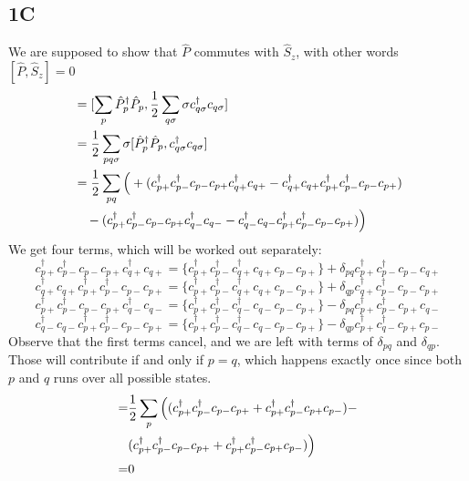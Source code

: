 \documentclass[norsk,a4paper,12pt]{article}
\begin{document}
\subsection*{1C}
We are supposed to show that $\hat{P}$ commutes with $\hat{S}_z$, with other words $[\hat{P},\hat{S}_z]=0$
\begin{align}
[\hat{P},\hat{S}_z]&=[\sum_p\hat{P}_p^{\dagger}\hat{P}_p,\frac{1}{2}\sum_{q\sigma}\sigma c_{q\sigma}^{\dagger}c_{q\sigma}]\notag\\
&=\frac{1}{2}\sum_{pq\sigma}\sigma[\hat{P}_p^{\dagger}\hat{P}_p,c_{q\sigma}^{\dagger}c_{q\sigma}]\notag\\
&=\frac{1}{2}\sum_{pq}\Big(+(c_{p+}^{\dagger}c_{p-}^{\dagger}c_{p-}c_{p+}c_{q+}^{\dagger}c_{q+}-c_{q+}^{\dagger}c_{q+}c_{p+}^{\dagger}c_{p-}^{\dagger}c_{p-}c_{p+})\notag\\
&\quad-(c_{p+}^{\dagger}c_{p-}^{\dagger}c_{p-}c_{p+}c_{q-}^{\dagger}c_{q-}-c_{q-}^{\dagger}c_{q-}c_{p+}^{\dagger}c_{p-}^{\dagger}c_{p-}c_{p+})\Big)
\end{align}
We get four terms, which will be worked out separately:
\begin{equation}
c_{p+}^{\dagger}c_{p-}^{\dagger}c_{p-}c_{p+}c_{q+}^{\dagger}c_{q+} = \{c_{p+}^{\dagger}c_{p-}^{\dagger}c_{q+}^{\dagger}c_{q+}c_{p-}c_{p+}\}+\delta_{pq}c_{p+}^{\dagger}c_{p-}^{\dagger}c_{p-}c_{q+}
\end{equation}
\begin{equation}
c_{q+}^{\dagger}c_{q+}c_{p+}^{\dagger}c_{p-}^{\dagger}c_{p-}c_{p+} = \{c_{p+}^{\dagger}c_{p-}^{\dagger}c_{q+}^{\dagger}c_{q+}c_{p-}c_{p+}\}+\delta_{qp}c_{q+}^{\dagger}c_{p-}^{\dagger}c_{p-}c_{p+}
\end{equation}
\begin{equation}
c_{p+}^{\dagger}c_{p-}^{\dagger}c_{p-}c_{p+}c_{q-}^{\dagger}c_{q-} = \{c_{p+}^{\dagger}c_{p-}^{\dagger}c_{q-}^{\dagger}c_{q-}c_{p-}c_{p+}\}-\delta_{pq}c_{p+}^{\dagger}c_{p-}^{\dagger}c_{p+}c_{q-}
\end{equation}
\begin{equation}
c_{q-}^{\dagger}c_{q-}c_{p+}^{\dagger}c_{p-}^{\dagger}c_{p-}c_{p+} = \{c_{p+}^{\dagger}c_{p-}^{\dagger}c_{q-}^{\dagger}c_{q-}c_{p-}c_{p+}\}-\delta_{qp}c_{p+}^{\dagger}c_{q-}^{\dagger}c_{p+}c_{p-}
\end{equation}
Observe that the first terms cancel, and we are left with terms of $\delta_{pq}$ and $\delta_{qp}$. Those will contribute if and only if $p=q$, which happens exactly once since both $p$ and $q$ runs over all possible states. 
\begin{align}
[\hat{P}, \hat{S}_z]=&\frac{1}{2}\sum_p\Big((c_{p+}^{\dagger}c_{p-}^{\dagger}c_{p-}c_{p+}+c_{p+}^{\dagger}c_{p-}^{\dagger}c_{p+}c_{p-})-\notag\\
&(c_{p+}^{\dagger}c_{p-}^{\dagger}c_{p-}c_{p+}+c_{p+}^{\dagger}c_{p-}^{\dagger}c_{p+}c_{p-})\Big)\\
=&0
\end{align}
\end{document}
